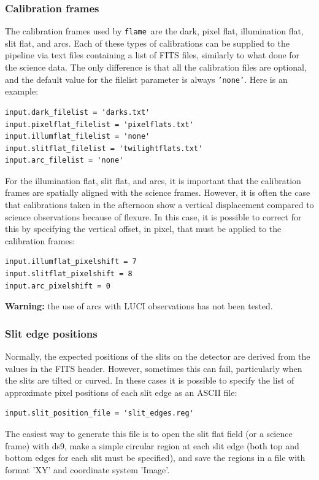 \documentclass[a4paper]{article}
\newcommand{\flame}{\texttt{flame}}
\begin{document}


\subsubsection{Calibration frames}
The calibration frames used by \flame\ are the dark, pixel flat, illumination flat, slit flat, and arcs. Each of these types of calibrations can be supplied to the pipeline via text files containing a list of FITS files, similarly to what done for the science data. The only difference is that all the calibration files are optional, and the default value for the filelist parameter is always \texttt{'none'}. Here is an example:
\begin{lstlisting}
input.dark_filelist = 'darks.txt'
input.pixelflat_filelist = 'pixelflats.txt'
input.illumflat_filelist = 'none'
input.slitflat_filelist = 'twilightflats.txt'
input.arc_filelist = 'none'
\end{lstlisting}
For the illumination flat, slit flat, and arcs, it is important that the calibration frames are spatially aligned with the science frames. However, it is often the case that calibrations taken in the afternoon show a vertical displacement compared to science observations because of flexure. In this case, it is possible to correct for this by specifying the vertical offset, in pixel, that must be applied to the calibration frames:
\begin{lstlisting}
input.illumflat_pixelshift = 7
input.slitflat_pixelshift = 8
input.arc_pixelshift = 0
\end{lstlisting}

\textbf{Warning:} the use of arcs with LUCI observations has not been tested.


\subsubsection{Slit edge positions}
Normally, the expected positions of the slits on the detector are derived from the values in the FITS header. However, sometimes this can fail, particularly when the slits are tilted or curved. In these cases it is possible to specify the list of approximate pixel positions of each slit edge as an ASCII file:
\begin{lstlisting}
input.slit_position_file = 'slit_edges.reg'
\end{lstlisting}
The easiest way to generate this file is to open the slit flat field (or a science frame) with ds9, make a simple circular region at each slit edge (both top and bottom edges for each slit must be specified), and save the regions in a file with format 'XY' and coordinate system 'Image'.
\end{document}
